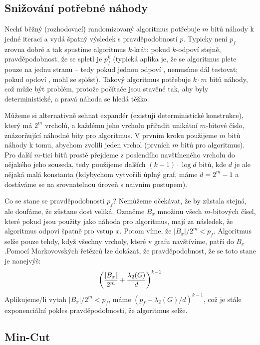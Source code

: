 \subsection{Snižování potřebné náhody}

Nechť běžný (rozhodovací) randomizovaný algoritmus potřebuje $m$ bitů náhody k jedné iteraci a
vydá špatný výsledek s pravděpodobností $p$. Typicky není $p_f$ zrovna dobré a tak
spustíme algoritmus $k$-krát: pokud $k$-odpoví stejně, pravděpodobnost, že se
spletl je $p_f^k$ (typická aplika je, že se algoritmus plete pouze na jednu
stranu -- tedy pokud jednou odpoví , nemusíme dál testovat; pokud opdoví
, mohl se splést). Takový algoritmus potřebuje $k\cdot m$ bitů náhody, což může být problém,
protože počítače jsou stavěné tak, aby byly deterministické, a pravá náhoda se
hledá těžko.

Můžeme si alternativně sehnat expandér (existují deterministické konstrukce),
který má $2^m$ vrcholů, a každému jeho vrcholu přiřadit unikátní $m$-bitové
číslo, znázorňující náhodné bity pro algoritmus. V prvním kroku použijeme $m$
bitů náhody k tomu, abychom zvolili jeden vrchol (prvních $m$ bitů pro
algoritmus). Pro další $m$-tici bitů prostě přejdeme z poslendího navštíneného
vrcholu do nějakého jeho souseda, tedy použijeme dalších $(k -1) \cdot \log d$ bitů, kde $d$
je ale nějaká malá konstanta (kdybychom vytvořili úplný graf, máme $d = 2^m-1$ a
dostáváme se na srovnatelnou úroveň s naivním postupem).

Co se stane se pravděpodobností $p_f$? Nemůžeme očekávat, že by zůstala stejná,
ale doufáme, že zůstane dost veliká. Označme $B_x$ množinu všech $m$-bitových
čísel, které pokud jsou použity jako náhoda pro algoritmus, mají za následek, že
algoritmus odpoví špatně pro vstup $x$. Potom víme, že $|B_x|/2^m < p_f$.
Algoritmus selže pouze tehdy, když všechny vrcholy, které v grafu navštívíme,
patří do $B_x$.Pomocí Markovovských řetězců lze dokázat, že pravděpodobnost, že
se toto stane je nanejvýš:
\begin{align}
	\left({|B_x| \over 2^m} + {\lambda_2(G) \over d}\right)^{k-1}
\end{align}
Aplikujeme/li vytah $|B_x|/2^m < p_f$, máme $(p_f + \lambda_2(G)/d)^{k-1}$, což
je stále exponenciální pokles pravděpodobnosti, že algoritmus selže.

\subsection{Min-Cut}

